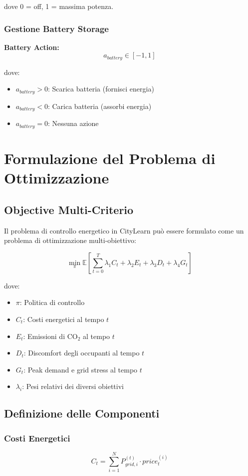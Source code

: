 \documentclass[12pt,a4paper,twoside]{report}
\begin{document}
dove 0 = off, 1 = massima potenza.

\subsubsection{Gestione Battery Storage}
\textbf{Battery Action:}
$$a_{battery} \in [-1, 1]$$

dove:
\begin{itemize}
    \item $a_{battery} > 0$: Scarica batteria (fornisci energia)
    \item $a_{battery} < 0$: Carica batteria (assorbi energia)
    \item $a_{battery} = 0$: Nessuna azione
\end{itemize}

\section{Formulazione del Problema di Ottimizzazione}

\subsection{Objective Multi-Criterio}

Il problema di controllo energetico in CityLearn può essere formulato come un problema di ottimizzazione multi-obiettivo:

$$\min_{\pi} \mathbb{E}[\sum_{t=0}^{T} \lambda_1 C_t + \lambda_2 E_t + \lambda_3 D_t + \lambda_4 G_t]$$

dove:
\begin{itemize}
    \item $\pi$: Politica di controllo
    \item $C_t$: Costi energetici al tempo $t$
    \item $E_t$: Emissioni di CO$_2$ al tempo $t$
    \item $D_t$: Discomfort degli occupanti al tempo $t$
    \item $G_t$: Peak demand e grid stress al tempo $t$
    \item $\lambda_i$: Pesi relativi dei diversi obiettivi
\end{itemize}

\subsection{Definizione delle Componenti}

\subsubsection{Costi Energetici}
$$C_t = \sum_{i=1}^{N} P_{grid,i}^{(t)} \cdot price_t^{(i)}$$
\end{document}
